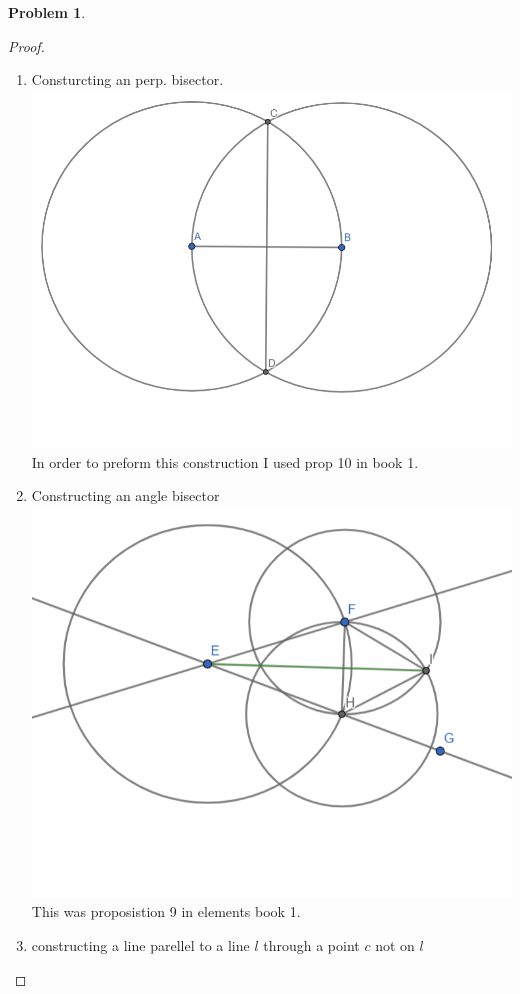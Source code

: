 \documentclass{article}
\newtheorem{prb}{Problem}
\begin{document}
\begin{prb} 

\end{prb} 
\begin{proof} 
	\begin{enumerate}
		\item Consturcting an perp. bisector. 
			\includegraphics[scale=.25]{BisectLine_prop10.png}
			In order to preform this construction I used prop 10
			in book 1. 
		\item Constructing an angle bisector 
			\includegraphics[scale=.25]{AngleBisect-prop9.png}
			This was proposistion 9 in elements book 1. 
		\item constructing  a line parellel to a line $l$ through a 
			point $c$ not on $l$
			\medskip
			\begin{center}


\end{center}
\end{enumerate}
\end{proof}
\end{document}
